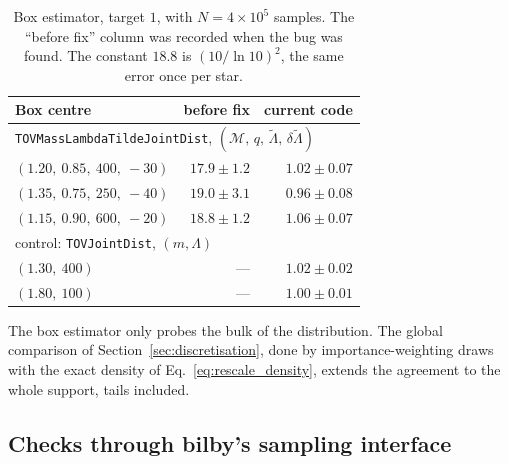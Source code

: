 \documentclass[11pt,a4paper]{article}
\newcommand{\Mc}{\mathcal{M}}
\newcommand{\lt}{\tilde{\Lambda}}
\newcommand{\dlt}{\delta\tilde{\Lambda}}
\newcommand{\code}[1]{\texttt{#1}}
\begin{document}
\begin{table}[h]
\centering
\begin{tabular}{lrr}
\toprule
Box centre & before fix & current code \\
\midrule
\multicolumn{3}{l}{\code{TOVMassLambdaTildeJointDist}, $(\Mc,\, q,\, \lt,\, \dlt)$} \\
$(1.20,\ 0.85,\ 400,\ -30)$ & $17.9 \pm 1.2$ & $1.02 \pm 0.07$ \\
$(1.35,\ 0.75,\ 250,\ -40)$ & $19.0 \pm 3.1$ & $0.96 \pm 0.08$ \\
$(1.15,\ 0.90,\ 600,\ -20)$ & $18.8 \pm 1.2$ & $1.06 \pm 0.07$ \\
\midrule
\multicolumn{3}{l}{control: \code{TOVJointDist}, $(m, \Lambda)$} \\
$(1.30,\ 400)$ & --- & $1.02 \pm 0.02$ \\
$(1.80,\ 100)$ & --- & $1.00 \pm 0.01$ \\
\bottomrule
\end{tabular}
\caption{Box estimator, target $1$, with $N = 4\times10^5$ samples. The
``before fix'' column was recorded when the bug was found. The constant
$18.8$ is $(10/\ln 10)^2$, the same error once per star.}
\end{table}

The box estimator only probes the bulk of the distribution. The global
comparison of Section~\ref{sec:discretisation}, done by importance-weighting
draws with the exact density of Eq.~\eqref{eq:rescale_density}, extends the
agreement to the whole support, tails included.

\subsection{Checks through bilby's sampling interface}
\end{document}
